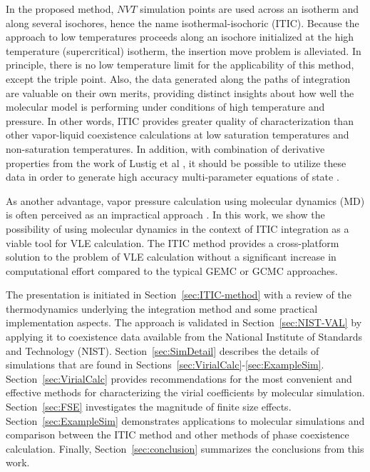 \documentclass[5p,times]{elsarticle}
\begin{document}
In the proposed method, $NVT$ simulation points are used across an isotherm and along several isochores, hence the name isothermal-isochoric (ITIC). Because the approach to low temperatures proceeds along an isochore initialized at the high temperature (supercritical) isotherm, the insertion move problem is alleviated. In principle, there is no low temperature limit for the applicability of this method, except the triple point. Also, the data generated along the paths of integration are valuable on their own merits, providing distinct insights about how well the molecular model is performing under conditions of high temperature and pressure. In other words, ITIC provides greater quality of characterization than other vapor-liquid coexistence calculations at low saturation temperatures and non-saturation temperatures. In addition, with combination of derivative properties from the work of Lustig et al \cite{Lustig2015}, it should be possible to utilize these data in order to generate high accuracy multi-parameter equations of state \cite{Thol2016_LJ,Thol2016_siloxane,Thol2016_siloxane_first,Thol2017,Rutkai2013,Rutkai2015,Thol2015,Thol2015b}.

As another advantage, vapor pressure calculation using molecular dynamics (MD) is often perceived as an impractical approach \cite{Nieto-Draghi2015}. In this work, we show the possibility of using molecular dynamics in the context of ITIC integration as a viable tool for VLE calculation. The ITIC method provides a cross-platform solution to the problem of VLE calculation without a significant increase in computational effort compared to the typical GEMC or GCMC approaches.
 
The presentation is initiated in Section~\ref{sec:ITIC-method} with a review of the thermodynamics underlying the integration method and some practical implementation aspects. The approach is validated in Section~\ref{sec:NIST-VAL} by applying it to coexistence data available from the National Institute of Standards and Technology (NIST). Section~\ref{sec:SimDetail} describes the details of simulations that are found in Sections~\ref{sec:VirialCalc}-\ref{sec:ExampleSim}. Section~\ref{sec:VirialCalc} provides recommendations for the most convenient and effective methods for characterizing the virial coefficients by molecular simulation. Section~\ref{sec:FSE} investigates the magnitude of finite size effects. Section~\ref{sec:ExampleSim} demonstrates applications to molecular simulations and comparison between the ITIC method and other methods of phase coexistence calculation. Finally, Section~\ref{sec:conclusion} summarizes the conclusions from this work.
\end{document}
